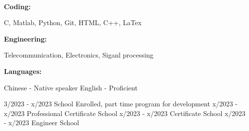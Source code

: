 \documentclass[9pt]{developercv} %
\begin{document}
\begin{minipage}[t]{0.46\textwidth}
        \lipsum[1][1-7]\\
\end{minipage}
\hfill %
\begin{minipage}[t]{0.465\textwidth}
    \vspace{-6pt}
    
    \begin{minipage}[t]{0.2\textwidth}
        \textbf{Coding:}
    \end{minipage}
    \hfill
    \begin{minipage}[t]{0.73\textwidth}
      C, Matlab, Python, Git, HTML, C++, LaTex  
    \end{minipage}
    \vspace{4mm}
    
    \begin{minipage}[t]{0.2\textwidth}
        \textbf{Engineering:}
    \end{minipage}
    \hfill
    \begin{minipage}[t]{0.73\textwidth}
       Telecommunication, Electronics, Siganl processing
    \end{minipage}
    \vspace{4mm}

    \begin{minipage}[t]{0.2\textwidth}
        \textbf{Languages:}
    \end{minipage}
    \hfill
    \begin{minipage}[t]{0.73\textwidth}
      Chinese - Native speaker
      \newline English - Proficient
    \end{minipage}
    
\end{minipage}

\begin{entrylist}
    \entry
		{3/2023 - x/2023}
		{\lipsum[1][1] }
		{School}
		{Enrolled, part time program for development}
    \entry
		{x/2023 - x/2023}
		{Professional Certificate}
		{School}
		{\lipsum[1][1]}
	\entry
		{x/2023 - x/2023}
		{Certificate}
		{School}
		{\lipsum[1][2]}
	\entry
		{x/2023 - x/2023}
		{Engineer}
		{School}
		{\lipsum[1][2]}
\end{entrylist}
\end{document}
